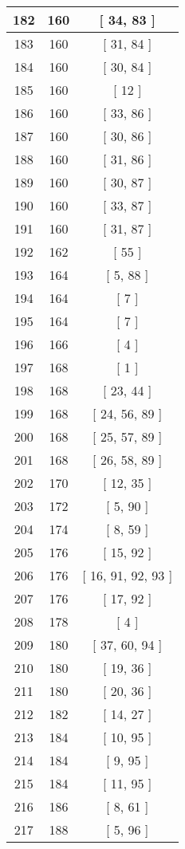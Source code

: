 \begin{center}
\begin{longtable}[H]{|| c c c ||}
\hline
182 & 160 & [ 34, 83 ] \\ 
\hline
183 & 160 & [ 31, 84 ] \\ 
\hline
184 & 160 & [ 30, 84 ] \\ 
\hline
185 & 160 & [ 12 ] \\ 
\hline
186 & 160 & [ 33, 86 ] \\ 
\hline
187 & 160 & [ 30, 86 ] \\ 
\hline
188 & 160 & [ 31, 86 ] \\ 
\hline
189 & 160 & [ 30, 87 ] \\ 
\hline
190 & 160 & [ 33, 87 ] \\ 
\hline
191 & 160 & [ 31, 87 ] \\ 
\hline
192 & 162 & [ 55 ] \\ 
\hline
193 & 164 & [ 5, 88 ] \\ 
\hline
194 & 164 & [ 7 ] \\ 
\hline
195 & 164 & [ 7 ] \\ 
\hline
196 & 166 & [ 4 ] \\ 
\hline
197 & 168 & [ 1 ] \\ 
\hline
198 & 168 & [ 23, 44 ] \\ 
\hline
199 & 168 & [ 24, 56, 89 ] \\ 
\hline
200 & 168 & [ 25, 57, 89 ] \\ 
\hline
201 & 168 & [ 26, 58, 89 ] \\ 
\hline
202 & 170 & [ 12, 35 ] \\ 
\hline
203 & 172 & [ 5, 90 ] \\ 
\hline
204 & 174 & [ 8, 59 ] \\ 
\hline
205 & 176 & [ 15, 92 ] \\ 
\hline
206 & 176 & [ 16, 91, 92, 93 ] \\ 
\hline
207 & 176 & [ 17, 92 ] \\ 
\hline
208 & 178 & [ 4 ] \\ 
\hline
209 & 180 & [ 37, 60, 94 ] \\ 
\hline
210 & 180 & [ 19, 36 ] \\ 
\hline
211 & 180 & [ 20, 36 ] \\ 
\hline
212 & 182 & [ 14, 27 ] \\ 
\hline
213 & 184 & [ 10, 95 ] \\ 
\hline
214 & 184 & [ 9, 95 ] \\ 
\hline
215 & 184 & [ 11, 95 ] \\ 
\hline
216 & 186 & [ 8, 61 ] \\ 
\hline
217 & 188 & [ 5, 96 ] \\ 

\end{longtable}
\end{center}
